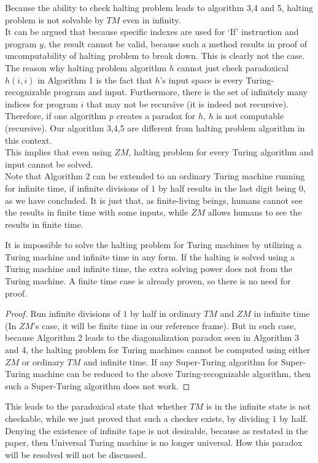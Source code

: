 \documentclass{roffin}
\begin{document}
Because the ability to check halting problem leads to algorithm 3,4 and 5, halting problem is not solvable by $TM$ even in infinity.\\
It can be argued that because specific indexes are used for `If' instruction and program $y$, the result cannot be valid, because such a method results in proof of uncomputability of halting problem to break down. This is clearly not the case. The reason why halting problem algorithm $h$ cannot just check paradoxical $h(i,i)$ in Algorithm 1 is the fact that $h$'s input space is every Turing-recognizable program and input. Furthermore, there is the set of infinitely many indices for program $i$ that may not be recursive (it is indeed not recursive). Therefore, if one algorithm $p$ creates a paradox for $h$, $h$ is not computable (recursive). Our algorithm 3,4,5 are different from halting problem algorithm in this context.\\ 
This implies that even using $ZM$, halting problem for every Turing algorithm and input cannot be solved.\\
Note that Algorithm 2 can be extended to an ordinary Turing machine running for infinite time, if infinite divisions of $1$ by half results in the last digit being $0$, as we have concluded. It is just that, as finite-living beings, humans cannot see the results in finite time with some inputs, while $ZM$ allows humans to see the results in finite time. 
\begin{proposition}
It is impossible to solve the halting problem for Turing machines by utilizing a Turing machine and infinite time in any form. If the halting is solved using a Turing machine and infinite time, the extra solving power does not from the Turing machine. A finite time case is already proven, so there is no need for proof.
\end{proposition}
\begin{proof}
Run infinite divisions of $1$ by half in ordinary $TM$ and $ZM$ in infinite time (In $ZM$'s case, it will be finite time in our reference frame). But in such case, because Algorithm 2 leads to the diagonalization paradox seen in Algorithm 3 and 4, the halting problem for Turing machines cannot be computed using either $ZM$ or ordinary $TM$ and infinite time. If any Super-Turing algorithm for Super-Turing machine can be reduced to the above Turing-recognizable algorithm, then such a Super-Turing algorithm does not work.   
\end{proof}
This leads to the paradoxical state that whether $TM$ is in the infinite state is not checkable, while we just proved that such a checker exists, by dividing $1$ by half. Denying the existence of infinite tape is not desirable, because as restated in the paper, then Universal Turing machine is no longer universal. How this paradox will be resolved will not be discussed.
\end{document}
